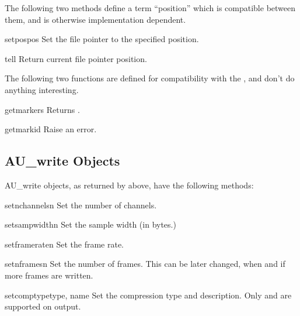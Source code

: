 The following two methods define a term ``position'' which is compatible
between them, and is otherwise implementation dependent.

\begin{methoddesc}[AU_read]{setpos}{pos}
Set the file pointer to the specified position.
\end{methoddesc}

\begin{methoddesc}[AU_read]{tell}{}
Return current file pointer position.
\end{methoddesc}

The following two functions are defined for compatibility with the 
, and don't do anything interesting.

\begin{methoddesc}[AU_read]{getmarkers}{}
Returns .
\end{methoddesc}

\begin{methoddesc}[AU_read]{getmark}{id}
Raise an error.
\end{methoddesc}


\subsection{AU_write Objects \label{au-write-objects}}

AU_write objects, as returned by  above, have the
following methods:

\begin{methoddesc}[AU_write]{setnchannels}{n}
Set the number of channels.
\end{methoddesc}

\begin{methoddesc}[AU_write]{setsampwidth}{n}
Set the sample width (in bytes.)
\end{methoddesc}

\begin{methoddesc}[AU_write]{setframerate}{n}
Set the frame rate.
\end{methoddesc}

\begin{methoddesc}[AU_write]{setnframes}{n}
Set the number of frames. This can be later changed, when and if more 
frames are written.
\end{methoddesc}


\begin{methoddesc}[AU_write]{setcomptype}{type, name}
Set the compression type and description.
Only  and  are supported on output.
\end{methoddesc}

